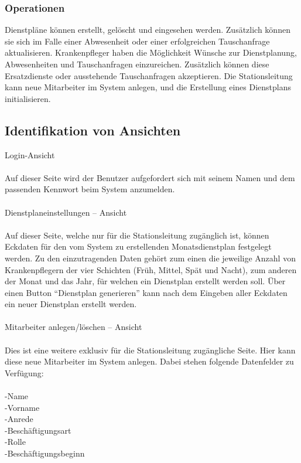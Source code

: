 \documentclass[11pt,
paper=a4,
bibtotocnumbered,	  %
liststotocnumbered,  %
DIV=calc,		  %
tablecaptionabove,	  %
headinclude,
]{article}
\begin{document}
\subsubsection{Operationen}
Dienstpläne können erstellt, gelöscht und eingesehen werden. Zusätzlich können sie sich im Falle einer Abwesenheit oder einer erfolgreichen Tauschanfrage aktualisieren. Krankenpfleger haben die Möglichkeit Wünsche zur Dienstplanung, Abwesenheiten und Tauschanfragen einzureichen. Zusätzlich können diese Ersatzdienste oder ausstehende Tauschanfragen akzeptieren. Die Stationsleitung kann neue Mitarbeiter im System anlegen, und die Erstellung eines Dienstplans initialisieren.
\subsection{Identifikation von Ansichten}
Login-Ansicht\\\\
Auf dieser Seite wird der Benutzer aufgefordert sich mit seinem Namen und dem passenden Kennwort beim System anzumelden.\\\\
Dienstplaneinstellungen – Ansicht\\\\
Auf dieser Seite, welche nur für die Stationsleitung zugänglich ist, können Eckdaten für den vom System zu erstellenden Monatsdienstplan festgelegt werden. Zu den einzutragenden Daten gehört zum einen die jeweilige Anzahl von Krankenpflegern der vier Schichten (Früh, Mittel, Spät und Nacht), zum anderen der Monat und das Jahr, für welchen ein Dienstplan erstellt werden soll. Über einen Button “Dienstplan generieren” kann nach dem Eingeben aller Eckdaten ein neuer Dienstplan erstellt werden.\\\\
Mitarbeiter anlegen/löschen – Ansicht\\\\
Dies ist eine weitere exklusiv für die Stationsleitung zugängliche Seite. Hier kann diese neue Mitarbeiter im System anlegen. Dabei stehen folgende Datenfelder zu Verfügung: \\\\

-Name \\
-Vorname\\
-Anrede\\
-Beschäftigungsart\\
-Rolle\\
-Beschäftigungsbeginn\\
\end{document}
